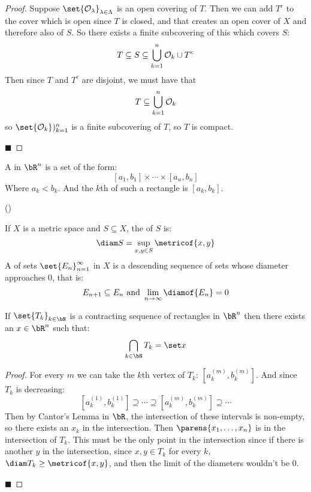 \documentclass[10pt]{article}
\def\openset{{\cal O}}
\begin{document}
\begin{proof}

    Suppose $\set{\openset_\lambda}_{\lambda\in\Lambda}$ is an open covering of $T$.
    Then we can add $T^c$ to the cover which is open since $T$ is closed, and that creates an open cover of $X$ and therefore also of $S$.
    So there exists a finite subcovering of this which covers $S$:
    \[ T\subseteq S\subseteq\bigcup_{k=1}^n\openset_k\cup T^c \]
    Then since $T$ and $T^c$ are disjoint, we must have that
    \[ T\subseteq\bigcup_{k=1}^n\openset_k \]
    so $\set{\openset_k})_{k=1}^n$ is a finite subcovering of $T$, so $T$ is compact.

    \hfill$\blacksquare$

\end{proof}

\begin{defn*}

    A  in $\bR^n$ is a set of the form:
    \[ [a_1,b_1]\times\cdots\times[a_n,b_n] \]
    Where $a_k<b_k$.
    And the $k$th  of such a rectangle is $[a_k, b_k]$.

\end{defn*}

(\vert)

\begin{defn*}

    If $X$ is a metric space and $S\subseteq X$, the  of $S$ is:
    \[ \diam S=\sup_{x,y\in S}\metricof{x,y} \]
    A  of sets $\set{E_n}_{n=1}^\infty$ in $X$ is a descending sequence of sets whose diameter approaches $0$, that is:
    \[ E_{n+1}\subseteq E_n \text{ and } \lim_{n\to\infty} \diamof{E_n} = 0 \]

\end{defn*}

\begin{thrm*}

    If $\set{T_k}_{k\in\bN}$ is a contracting sequence of rectangles in $\bR^n$ then there exists an $x\in\bR^n$ such that:
    \[ \bigcap_{k\in\bN} T_k = \set x \]

\end{thrm*}

\begin{proof}

    For every $m$ we can take the $k$th vertex of $T_k$: $[a_k^{(m)}, b_k^{(m)}]$.
    And since $T_k$ is decreasing:
    \[ [a_k^{(1)}, b_k^{(1)}] \supseteq \cdots \supseteq [a_k^{(m)}, b_k^{(m)}] \supseteq \cdots \]
    Then by Cantor's Lemma in $\bR$, the intersection of these intervals is non-empty, so there exists an $x_k$ in the intersection.
    Then $\parens{x_1,\dots,x_n}$ is in the intersection of $T_k$.
    This must be the only point in the intersection since if there is another $y$ in the intersection, since $x,y\in T_k$ for every $k$,
    $\diam T_k\geq\metricof{x,y}$, and then the limit of the diameters wouldn't be $0$.

    \hfill$\blacksquare$

\end{proof}
\end{document}
